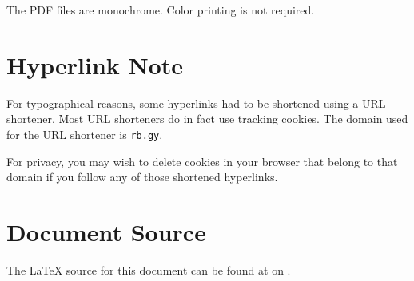The PDF files are monochrome. Color printing is not required.


\section*{Hyperlink Note}

For typographical reasons, some hyperlinks had to be shortened using a URL shortener. Most URL
shorteners do in fact use tracking cookies. The domain used for the URL shortener is
\texttt{rb.gy}.

For privacy, you may wish to delete cookies in your browser that belong to that domain if you
follow any of those shortened hyperlinks.


\section*{Document Source}

The \LaTeX{} source for this document can be found at on
.
